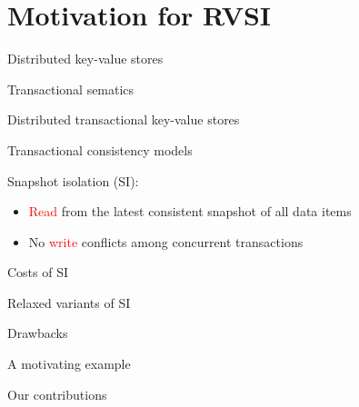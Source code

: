 \section{Motivation for RVSI}

\begin{frame}{}
  Distributed key-value stores

  \centerline{\putop{} \qquad \getop{}}
\end{frame}

\begin{frame}{}
  Transactional sematics

  Distributed transactional key-value stores
\end{frame}

\begin{frame}{}
  Transactional consistency models

  Snapshot isolation (SI):
  \begin{itemize}
    \item \textcolor{red}{Read} from the latest consistent snapshot of all data items
    \item No \textcolor{red}{write} conflicts among concurrent transactions
  \end{itemize}
\end{frame}

\begin{frame}{}
  Costs of SI

  Relaxed variants of SI
\end{frame}

\begin{frame}{}
  Drawbacks
\end{frame}

\begin{frame}{}
  A motivating example
\end{frame}

\begin{frame}{}
  Our contributions
\end{frame}

\begin{frame}{}
\end{frame}
